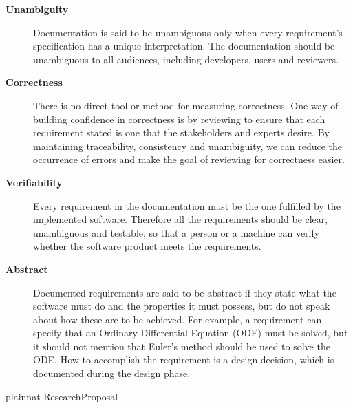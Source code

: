 \documentclass[12pt]{article}
\begin{document}
\begin{description}
\item [\textbf{Unambiguity}] Documentation is said to be unambiguous only when
  every requirement's specification has a unique interpretation.  The
  documentation should be unambiguous to all audiences, including developers,
  users and reviewers.

\item [\textbf{Correctness}] There is no direct tool or method for measuring
  correctness. One way of building confidence in correctness is by reviewing to
  ensure that each requirement stated is one that the stakeholders and experts
  desire.  By maintaining traceability, consistency and unambiguity, we can
  reduce the occurrence of errors and make the goal of reviewing for correctness
  easier.

\item [\textbf{Verifiability}] Every requirement in the documentation must be the
  one fulfilled by the implemented software. Therefore all the requirements
  should be clear, unambiguous and testable, so that a person or a machine can
  verify whether the software product meets the requirements.

\item [\textbf{Abstract}] Documented requirements are said to be abstract if they
  state what the software must do and the properties it must possess, but do not
  speak about how these are to be achieved. For example, a requirement can
  specify that an Ordinary Differential Equation (ODE) must be solved, but it
  should not mention that Euler's method should be used to solve the ODE. How to
  accomplish the requirement is a design decision, which is documented during
  the design phase.

\end{description}

\newpage

 {plainnat}
 {ResearchProposal}
\end{document}
